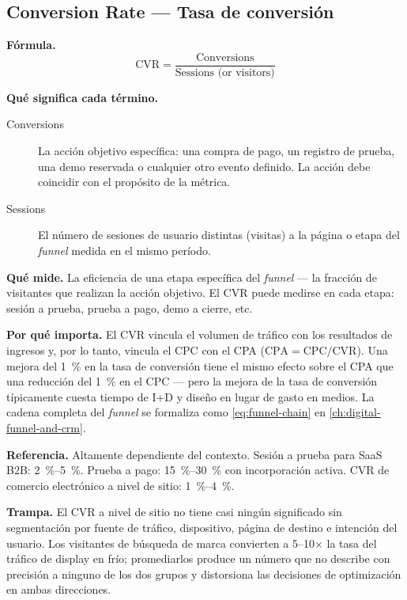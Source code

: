 \subsection{Conversion Rate --- Tasa de conversión}

\textbf{Fórmula.}
\[
  \mathrm{CVR} = \frac{\text{Conversions}}{\text{Sessions (or visitors)}}
\]

\textbf{Qué significa cada término.}
\begin{description}
  \item[Conversions] La acción objetivo específica: una compra de pago, un registro de
    prueba, una demo reservada o cualquier otro evento definido. La acción debe coincidir con
    el propósito de la métrica.
  \item[Sessions] El número de sesiones de usuario distintas (visitas) a la página o etapa
    del \emph{funnel} medida en el mismo período.
\end{description}

\textbf{Qué mide.} La eficiencia de una etapa específica del \emph{funnel} --- la fracción
de visitantes que realizan la acción objetivo. El CVR puede medirse en cada etapa: sesión a
prueba, prueba a pago, demo a cierre, etc.

\textbf{Por qué importa.} El CVR vincula el volumen de tráfico con los resultados de
ingresos y, por lo tanto, vincula el CPC con el CPA ($\mathrm{CPA} = \mathrm{CPC}/\mathrm{CVR}$).
Una mejora del \qty{1}{\percent} en la tasa de conversión tiene el mismo efecto sobre el CPA
que una reducción del \qty{1}{\percent} en el CPC --- pero la mejora de la tasa de conversión
típicamente cuesta tiempo de I+D y diseño en lugar de gasto en medios. La cadena completa
del \emph{funnel} se formaliza como \cref{eq:funnel-chain} en \cref{ch:digital-funnel-and-crm}.

\textbf{Referencia.} Altamente dependiente del contexto. Sesión a prueba para SaaS B2B:
\qty{2}{\percent}--\qty{5}{\percent}. Prueba a pago: \qty{15}{\percent}--\qty{30}{\percent}
con incorporación activa. CVR de comercio electrónico a nivel de sitio:
\qty{1}{\percent}--\qty{4}{\percent}.

\textbf{Trampa.} El CVR a nivel de sitio no tiene casi ningún significado sin segmentación
por fuente de tráfico, dispositivo, página de destino e intención del usuario. Los visitantes
de búsqueda de marca convierten a 5--10$\times$ la tasa del tráfico de display en frío;
promediarlos produce un número que no describe con precisión a ninguno de los dos grupos y
distorsiona las decisiones de optimización en ambas direcciones.

